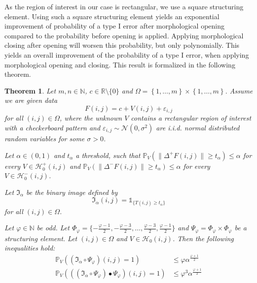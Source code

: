 \documentclass[a4paper,12pt]{article}
\newcommand{\norm}[1]{\lVert#1\rVert}
\theoremstyle{plain}
\newtheorem{theorem}{Theorem}[section]
\theoremstyle{definition}
\begin{document}
As the region of interest in our case is rectangular, we use a square structuring element. Using such a square structuring element yields an exponential improvement of probability of a type I error after morphological opening compared to the probability before opening is applied. Applying morphological closing after opening will worsen this probability, but only polynomially. This yields an overall improvement of the probability of a type I error, when applying morphological opening and closing. This result is formalized in the following theorem.
\begin{theorem}
	Let $m, n \in \mathbb{N}$, $c \in \mathbb{R} \setminus \{ 0 \}$ and $\Omega = \left\{ 1, \dots, m \right\} \times \left\{ 1, \dots, m \right\}$. Assume we are given data
	\begin{equation*}
		F(i, j) = c + V(i, j) + \varepsilon_{i, j}
	\end{equation*}
	for all $(i, j) \in \Omega$, where the unknown $V$ contains a rectangular region of interest with a checkerboard pattern and $\varepsilon_{i, j} \sim \mathcal{N}(0, \sigma^2)$ are i.i.d. normal distributed random variables for some $\sigma > 0$.
	
	Let $\alpha \in (0, 1)$ and $t_\alpha$ a threshold, such that $\mathbb{P}_V( \norm{\Delta^+ F(i, j)} \geq t_\alpha ) \leq \alpha$ for every $V \in \mathcal{H}_0^+(i, j)$ and $\mathbb{P}_V( \norm{\Delta^- F(i, j)} \geq t_\alpha ) \leq \alpha$ for every $V \in \mathcal{H}_0^-(i, j)$.
	
	Let $\mathfrak{I}_\alpha$ be the binary image defined by
	\begin{equation*}
		\mathfrak{I}_\alpha(i, j) = \mathds{1}_{ \{ T(i, j) \geq t_\alpha \} }
	\end{equation*}
	for all $(i, j) \in \Omega$.
	
	Let $\varphi \in \mathbb{N}$ be odd. Let $\Phi_\varphi = \{ -\frac{\varphi - 1}{2}, -\frac{\varphi - 3}{2}, \dots, \frac{\varphi - 3}{2}, \frac{\varphi - 1}{2} \}$ and $\Psi_\varphi = \Phi_\varphi \times \Phi_\varphi$ be a structuring element. Let $(i, j) \in \Omega$ and $V \in \mathcal{H}_0(i, j)$.
	Then the following inequalities hold:
	\begin{align}
		\mathbb{P}_V\left( (\mathfrak{I}_\alpha \circ \Psi_\varphi)(i, j) = 1 \right) &\leq \varphi \alpha^{\frac{\varphi + 1}{2}} \\
		\mathbb{P}_V\left( ((\mathfrak{I}_\alpha \circ \Psi_\varphi) \bullet \Psi_\varphi)(i, j) = 1 \right) &\leq \varphi^3 \alpha^{\frac{\varphi + 1}{2}}
	\end{align}
\end{theorem}
\end{document}
